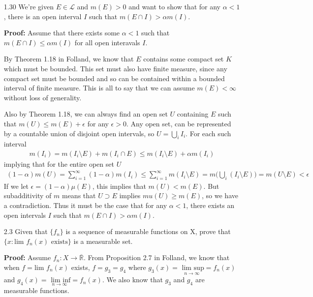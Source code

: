 \documentclass[11pt,letter]{article}
\begin{document}
\begin{enumerate}
    \item[1.30] We're given $E \in \mathcal{L}$ and $m(E) > 0$ and want to show that for any $\alpha < 1$, there is an open interval $I$ such that $m(E \cap I) > \alpha m(I)$.

    \textbf{Proof:} Assume that there exists some $\alpha < 1$ such that $m(E \cap I) \le \alpha m(I)$ for all open interavals $I$. 
    
    By Theorem 1.18 in Folland, we know that $E$ contains some compact set $K$ which must be bounded. This set must also have finite measure, since any compact set must be bounded and so can be contained within a bounded interval of finite measure. This is all to say that we can assume $m(E) < \infty$ without loss of generality.

    Also by Theorem 1.18, we can always find an open set $U$ containing $E$ such that $m(U) \le m(E) + \epsilon$ for any $\epsilon > 0$. Any open set, can be represented by a countable union of disjoint open intervals, so $U = \bigcup_i I_i$. For each such interval
    \begin{align*}
        m(I_i) = m(I_i \setminus E) + m(I_i \cap E) \le m(I_i \setminus E) + \alpha m(I_i)
    \end{align*}
    implying that for the entire open set $U$
    \begin{align*}
        (1-\alpha)m(U) = \sum_{i=1}^\infty (1-\alpha)m(I_i) \le \sum_{i=1}^\infty m(I_i \setminus E) = m\big(\bigcup_i(I_i \setminus E)\big) = m(U\setminus E) < \epsilon
    \end{align*}
    If we let $\epsilon = (1-\alpha)\mu(E)$, this implies that $m(U) < m(E)$. But subadditivity of $m$ means that $U \supset E$ implies $mu(U) \ge m(E)$, so we have a contradiction. Thus it must be the case that for any $\alpha < 1$, there exists an open intervals $I$ such that $m(E \cap I) > \alpha m(I)$.

    \item[2.3] Given that $\{f_n\}$ is a sequence of measurable functions on X, prove that $\{x: \text{lim }f_n(x) \text{ exists}\}$ is a measurable set.

    \textbf{Proof:} Assume $f_n:X \rightarrow \overline{\mathbb{R}}$. From Proposition 2.7 in Folland, we know that when $f = \text{lim } f_n(x)$ exists, $f = g_3 = g_4$ where $g_3(x) = \underset{n \rightarrow \infty}{\text{ lim sup}} = f_n(x)$ and $g_4(x) = \underset{n \rightarrow \infty}{\text{ lim inf}} = f_n(x)$. We also know that $g_3$ and $g_4$ are measurable functions.


\end{enumerate}
\end{document}
